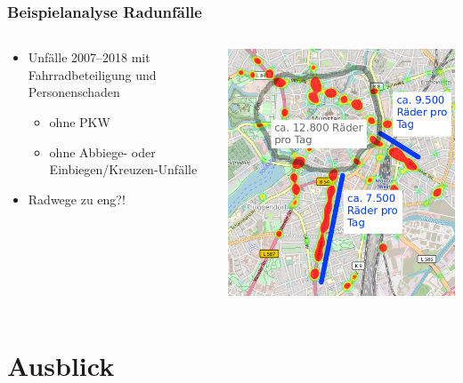 \documentclass{beamer}
\begin{document}
\begin{frame}
  \frametitle{Beispielanalyse Radunfälle}
  \centering
  \begin{columns}
    \begin{column}{0.5\textwidth}
      \begin{itemize}
    \item Unfälle 2007--2018 mit Fahrradbeteiligung und Personenschaden 
    \begin{itemize}
      \item ohne PKW
      \item ohne Abbiege- oder Einbiegen/Kreuzen-Unfälle
    \end{itemize}
    \item<2> Radwege zu eng?!
  \end{itemize}
    \end{column}
    \begin{column}{0.5\textwidth}
      \includegraphics[width=\textwidth]{img/radwege-unfaelle.png}
    \end{column}
  \end{columns} 
\end{frame}

\section{Ausblick}
\end{document}
